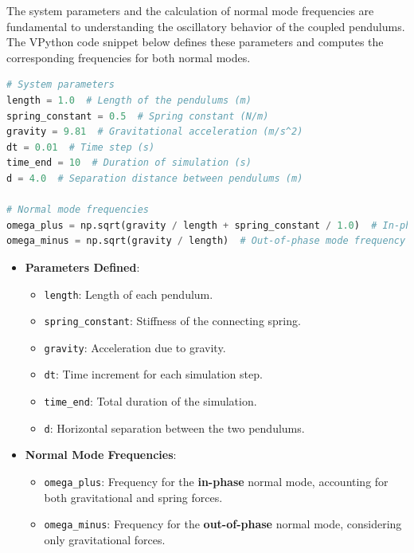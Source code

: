 \documentclass[12pt]{report} %
\begin{document}
The system parameters and the calculation of normal mode frequencies are fundamental to understanding the oscillatory behavior of the coupled pendulums. The VPython code snippet below defines these parameters and computes the corresponding frequencies for both normal modes.

\begin{lstlisting}[language=Python, caption={Defining System Parameters and Calculating Normal Mode Frequencies}, label={lst:parameters_frequencies}]
# System parameters
length = 1.0  # Length of the pendulums (m)
spring_constant = 0.5  # Spring constant (N/m)
gravity = 9.81  # Gravitational acceleration (m/s^2)
dt = 0.01  # Time step (s)
time_end = 10  # Duration of simulation (s)
d = 4.0  # Separation distance between pendulums (m)

# Normal mode frequencies
omega_plus = np.sqrt(gravity / length + spring_constant / 1.0)  # In-phase mode frequency
omega_minus = np.sqrt(gravity / length)  # Out-of-phase mode frequency
\end{lstlisting}

\begin{itemize}
    \item \textbf{Parameters Defined}:
    \begin{itemize}
        \item \texttt{length}: Length of each pendulum.
        \item \texttt{spring\_constant}: Stiffness of the connecting spring.
        \item \texttt{gravity}: Acceleration due to gravity.
        \item \texttt{dt}: Time increment for each simulation step.
        \item \texttt{time\_end}: Total duration of the simulation.
        \item \texttt{d}: Horizontal separation between the two pendulums.
    \end{itemize}
    
    \item \textbf{Normal Mode Frequencies}:
    \begin{itemize}
        \item \texttt{omega\_plus}: Frequency for the \textbf{in-phase} normal mode, accounting for both gravitational and spring forces.
        \item \texttt{omega\_minus}: Frequency for the \textbf{out-of-phase} normal mode, considering only gravitational forces.
    \end{itemize}
\end{itemize}
\end{document}
